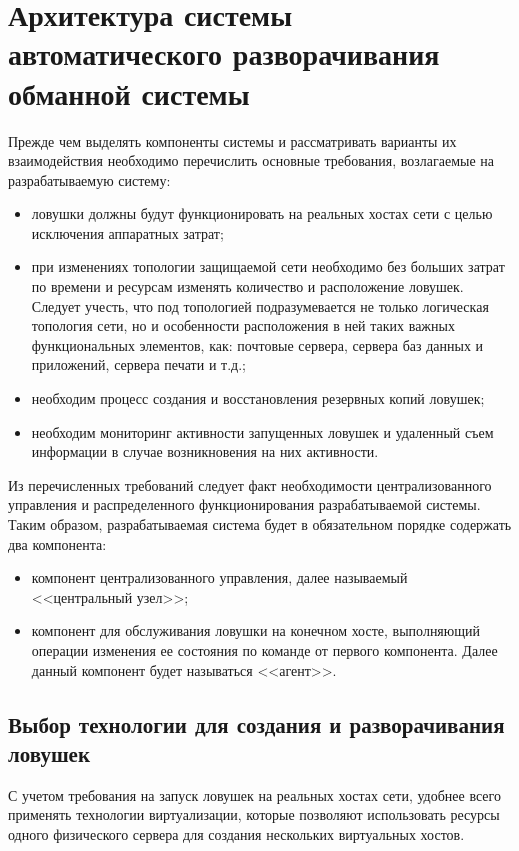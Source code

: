 \section{Архитектура системы автоматического разворачивания обманной системы}

Прежде чем выделять компоненты системы и рассматривать варианты их взаимодействия необходимо перечислить основные требования, возлагаемые на разрабатываемую систему:
\begin{itemize}
\item ловушки должны будут функционировать на реальных хостах сети с целью исключения аппаратных затрат;
\item при изменениях топологии защищаемой сети необходимо без больших затрат по времени и ресурсам изменять количество и расположение ловушек. Следует учесть, что под топологией подразумевается не только логическая топология сети, но и особенности расположения в ней таких важных функциональных элементов, как: почтовые сервера, сервера баз данных и приложений, сервера печати и т.д.;
\item необходим процесс создания и восстановления резервных копий ловушек;
\item необходим мониторинг активности запущенных ловушек и удаленный съем информации в случае возникновения на них активности.
\end{itemize}

Из перечисленных требований следует факт необходимости централизованного управления и распределенного функционирования разрабатываемой системы. Таким образом, разрабатываемая система будет в обязательном порядке содержать два компонента:
\begin{itemize}
	\item компонент централизованного управления, далее называемый <<центральный узел>>;
	\item компонент для обслуживания ловушки на конечном хосте, выполняющий операции изменения ее состояния по команде от первого компонента. Далее данный компонент будет называться <<агент>>.
\end{itemize}


\subsection{Выбор технологии для создания и разворачивания ловушек}

С учетом требования на запуск ловушек на реальных хостах сети, удобнее всего применять технологии виртуализации, которые позволяют использовать ресурсы одного физического сервера для создания нескольких виртуальных хостов.

